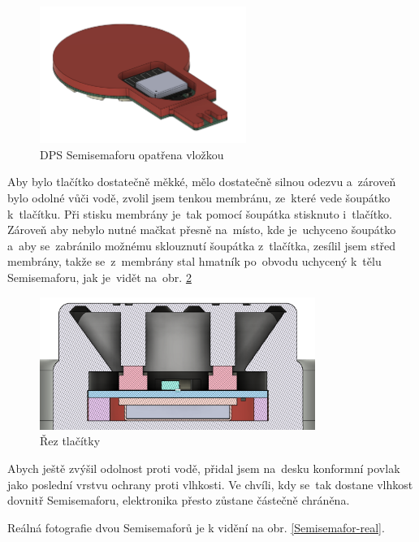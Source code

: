 \begin{figure}[!h]
  \centering
  \includegraphics[width=0.6\textwidth]{text/PraktickaCast/img/Semisemafor-vlozka.png}
  \caption{DPS Semisemaforu opatřena vložkou}
  \label{Semisemafor-vlozka}
\end{figure}

Aby bylo tlačítko dostatečně měkké, mělo dostatečně silnou odezvu a~zároveň bylo odolné vůči vodě,
zvolil jsem tenkou membránu, ze~které vede šoupátko k~tlačítku.
Při stisku membrány je~tak pomocí šoupátka stisknuto i~tlačítko.
Zároveň aby nebylo nutné mačkat přesně na~místo, kde je~uchyceno šoupátko a~aby se~zabránilo možnému sklouznutí šoupátka z~tlačítka,
zesílil jsem střed membrány, takže se~z~membrány stal hmatník po~obvodu uchycený k~tělu Semisemaforu, jak je~vidět na~obr. \ref{Semisemafor-rez-tlacitky}

\begin{figure}[!h]
  \centering
  \includegraphics[width=0.8\textwidth]{text/PraktickaCast/img/RezSemaforem.png}
  \caption{Řez tlačítky}
  \label{Semisemafor-rez-tlacitky}
\end{figure}

Abych ještě zvýšil odolnost proti vodě, přidal jsem na~desku konformní povlak jako poslední vrstvu ochrany proti vlhkosti.
Ve chvíli, kdy se~tak dostane vlhkost dovnitř Semisemaforu, elektronika přesto zůstane částečně chráněna.

Reálná fotografie dvou Semisemaforů je k vidění na obr. \ref{Semisemafor-real}.

